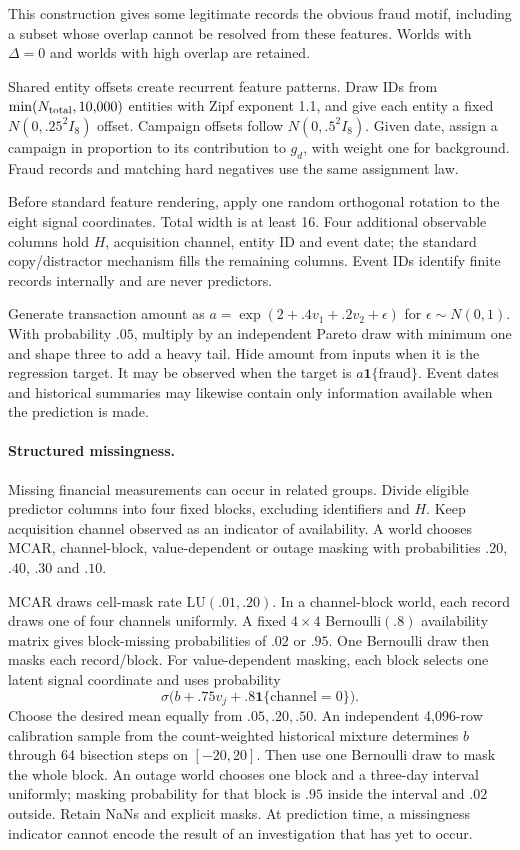 \documentclass[11pt]{article}
\newcommand{\ind}{\mathbf{1}}
\begin{document}
This construction gives some legitimate records the obvious fraud motif, including a subset whose overlap cannot be resolved from these features. Worlds with $\Delta=0$ and worlds with high overlap are retained.

Shared entity offsets create recurrent feature patterns. Draw IDs from $\min(N_{\rm total},10{,}000)$ entities with Zipf exponent 1.1, and give each entity a fixed $N(0,.25^2I_8)$ offset. Campaign offsets follow $N(0,.5^2I_8)$. Given date, assign a campaign in proportion to its contribution to $g_d$, with weight one for background. Fraud records and matching hard negatives use the same assignment law.

Before standard feature rendering, apply one random orthogonal rotation to the eight signal coordinates. Total width is at least 16. Four additional observable columns hold $H$, acquisition channel, entity ID and event date; the standard copy/distractor mechanism fills the remaining columns. Event IDs identify finite records internally and are never predictors.

Generate transaction amount as $a=\exp(2+.4v_1+.2v_2+\epsilon)$ for $\epsilon\sim N(0,1)$. With probability $.05$, multiply by an independent Pareto draw with minimum one and shape three to add a heavy tail. Hide amount from inputs when it is the regression target. It may be observed when the target is $a\ind\{\mathrm{fraud}\}$. Event dates and historical summaries may likewise contain only information available when the prediction is made.

\paragraph{Structured missingness.} Missing financial measurements can occur in related groups. Divide eligible predictor columns into four fixed blocks, excluding identifiers and $H$. Keep acquisition channel observed as an indicator of availability. A world chooses MCAR, channel-block, value-dependent or outage masking with probabilities $.20$, $.40$, $.30$ and $.10$.

MCAR draws cell-mask rate $\mathrm{LU}(.01,.20)$. In a channel-block world, each record draws one of four channels uniformly. A fixed $4\times4$ Bernoulli$(.8)$ availability matrix gives block-missing probabilities of $.02$ or $.95$. One Bernoulli draw then masks each record/block. For value-dependent masking, each block selects one latent signal coordinate and uses probability
\[
\sigma\bigl(b+.75v_j+.8\ind\{\mathrm{channel}=0\}\bigr).
\]
Choose the desired mean equally from $.05,.20,.50$. An independent 4,096-row calibration sample from the count-weighted historical mixture determines $b$ through 64 bisection steps on $[-20,20]$. Then use one Bernoulli draw to mask the whole block. An outage world chooses one block and a three-day interval uniformly; masking probability for that block is $.95$ inside the interval and $.02$ outside. Retain NaNs and explicit masks. At prediction time, a missingness indicator cannot encode the result of an investigation that has yet to occur.
\end{document}

